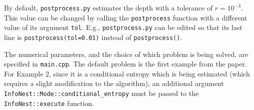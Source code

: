 \documentclass[entropy,article,accept,oneauthor,pdftex,10pt,a4paper]{mdpi}
\begin{document}
By default, {\tt postprocess.py} estimates the depth with a tolerance of
$r=10^{-3}$. This value can be changed by calling the {\tt postprocess}
function with a different value of its argument {\tt tol}. E.g.,
{\tt postprocess.py} can be edited so that its last line is
{\tt postprocess(tol=0.01)} instead of {\tt postprocess()}.

The numerical parameters, and the choice of which problem is being solved,
are specified in {\tt main.cpp}. The default problem is the first example
from the paper. For Example 2, since it is a conditional entropy which is
being estimated (which requires a slight modification to the algorithm),
an additional argument {\tt InfoNest::Mode::conditional\_entropy}
must be passed to the {\tt InfoNest::execute} function.


%

\end{document}
